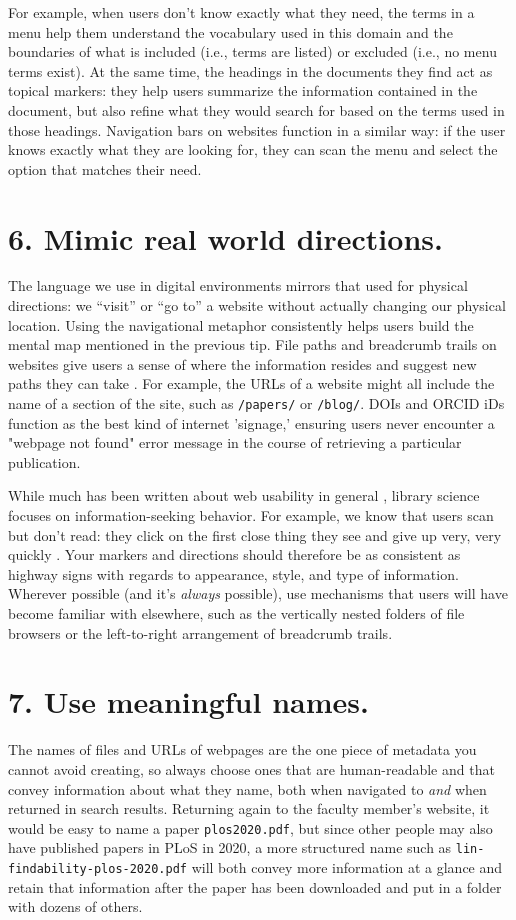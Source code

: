 \documentclass[10pt,letterpaper]{article}
\newcommand{\rulemajor}[1]{\section*{#1}}
\begin{document}
For example, when users don't know exactly what they need, the terms in a menu
help them understand the vocabulary used in this domain and the boundaries of
what is included (i.e., terms are listed) or excluded (i.e., no menu terms
exist). At the same time, the headings in the documents they find act as topical
markers: they help users summarize the information contained in the document,
but also refine what they would search for based on the terms used in those
headings. Navigation bars on websites function in a similar way: if the user
knows exactly what they are looking for, they can scan the menu and select the
option that matches their need.

\rulemajor{6. Mimic real world directions.}

The language we use in digital environments mirrors that used for physical
directions: we ``visit'' or ``go to'' a website without actually changing our
physical location. Using the navigational metaphor consistently helps users
build the mental map mentioned in the previous tip. File paths and breadcrumb
trails on websites give users a sense of where the information resides and
suggest new paths they can take \cite{Krug2014}. For example, the URLs of a
website might all include the name of a section of the site, such as
\texttt{/papers/} or \texttt{/blog/}.  
DOIs and ORCID iDs function as the best kind of internet 'signage,' ensuring users never encounter a "webpage not found" error message in the course of retrieving a particular publication.

While much has been written about web usability in general
\cite{Covert2014,NNG2020}, library science focuses on information-seeking
behavior.  For example, we know that users scan but don't read: they click on
the first close thing they see and give up very, very quickly
\cite{Bates2002}. Your markers and directions should therefore be as consistent
as highway signs with regards to appearance, style, and type of
information. Wherever possible (and it's \emph{always} possible), use mechanisms
that users will have become familiar with elsewhere, such as the vertically
nested folders of file browsers or the left-to-right arrangement of breadcrumb
trails.

\rulemajor{7. Use meaningful names.}

The names of files and URLs of webpages are the one piece of metadata you cannot
avoid creating, so always choose ones that are human-readable and that convey
information about what they name, both when navigated to \emph{and} when
returned in search results. Returning again to the faculty member's website, it
would be easy to name a paper \texttt{plos2020.pdf}, but since other people may
also have published papers in PLoS in 2020, a more structured name such as
\texttt{lin-findability-plos-2020.pdf} will both convey more information at a
glance and retain that information after the paper has been downloaded and put
in a folder with dozens of others.
\end{document}
